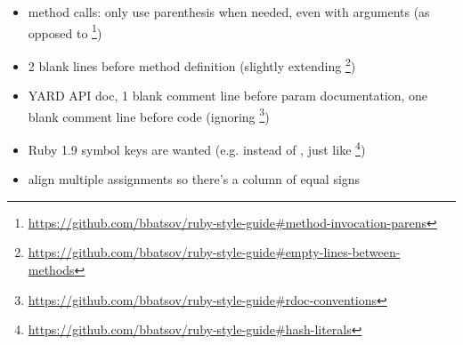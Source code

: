 \begin{itemize}
	\item method calls: only use parenthesis when needed, even with arguments (as opposed to \footnote{\url{https://github.com/bbatsov/ruby-style-guide\#method-invocation-parens}})
	\item 2 blank lines before method definition (slightly extending \footnote{\url{https://github.com/bbatsov/ruby-style-guide\#empty-lines-between-methods}})
	\item YARD API doc, 1 blank comment line before param documentation, one blank comment line before code (ignoring \footnote{\url{https://github.com/bbatsov/ruby-style-guide\#rdoc-conventions}})
	\item Ruby 1.9 symbol keys are wanted (e.g.  instead of , just like \footnote{\url{https://github.com/bbatsov/ruby-style-guide\#hash-literals}})
	\item align multiple assignments so there's a column of equal signs
\end{itemize}
